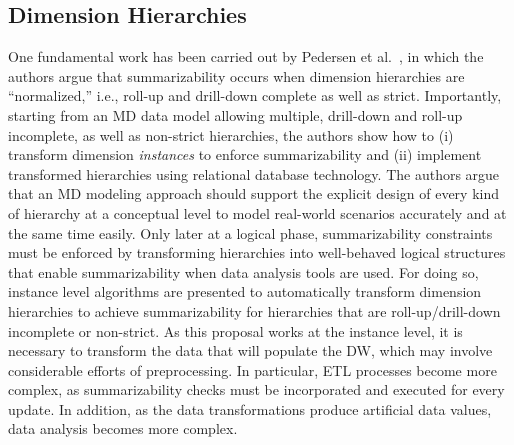 \subsection{Dimension Hierarchies}
\label{a1:sec:dim-hierarchies} One fundamental work has been carried
out by Pedersen et
al.~\cite{DBLP:conf/vldb/PedersenJD99,DBLP:journals/is/PedersenJD01},
in which the authors argue that summarizability occurs when
dimension hierarchies are ``normalized,'' i.e., roll-up and
drill-down complete as well as strict.  Importantly, starting from
an MD data model allowing multiple, drill-down and roll-up
incomplete, as well as non-strict hierarchies, the authors show how
to (i) transform dimension \emph{instances} to enforce
summarizability and (ii) implement transformed hierarchies using
relational database technology. The authors argue that an MD
modeling approach should support the explicit design of every kind
of hierarchy at a conceptual level to model real-world scenarios
accurately and at the same time easily. Only later at a logical
phase, summarizability constraints must be enforced by transforming
hierarchies into well-behaved logical structures that enable
summarizability when data analysis tools are used. For doing so,
instance level algorithms are presented to automatically transform
dimension hierarchies to achieve summarizability for hierarchies
that are roll-up/drill-down incomplete or non-strict. As this
proposal works at the instance level, it is necessary to transform
the data that will populate the DW, which may involve considerable
efforts of preprocessing. In particular, ETL processes become more
complex, as summarizability checks must be incorporated and executed
for every update.  In addition, as the data transformations produce
artificial data values, data analysis becomes more complex.

